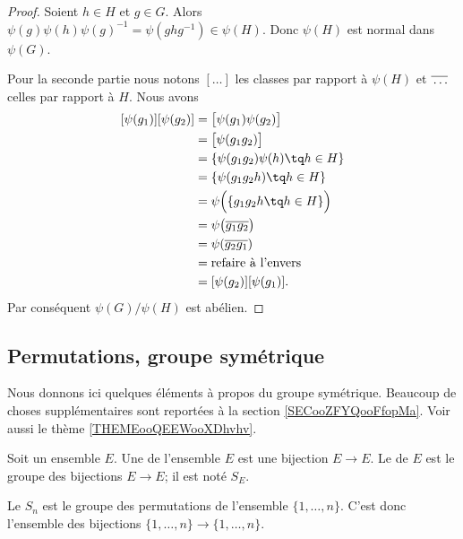 \begin{proof}
	Soient \( h\in H\) et \( g\in G\). Alors \( \psi(g)\psi(h)\psi(g)^{-1}=\psi(ghg^{-1})\in\psi(H)\). Donc \( \psi(H)\) est normal dans \( \psi(G)\).

	Pour la seconde partie nous notons \( [\ldots]\) les classes par rapport à \( \psi(H)\) et \( \overline{ \vphantom{g}\ldots }\) celles par rapport à \( H\). Nous avons
	\begin{subequations}
		\begin{align}
			[\psi(g_1)][\psi(g_2)] & =\big[ \psi(g_1)\psi(g_2) \big]            \\
			                       & =\big[ \psi(g_1g_2) \big]                  \\
			                       & =\{ \psi(g_1g_2)\psi(h)\tq h\in H \}       \\
			                       & =\{ \psi(g_1g_2h)\tq h\in H \}             \\
			                       & =\psi\Big(  \{ g_1g_2h\tq h\in H \}  \Big) \\
			                       & =\psi\big( \overline{ g_1g_2 } \big)       \\
			                       & =\psi(\overline{ g_2g_1 })                 \\
			                       & =\text{refaire à l'envers}                 \\
			                       & =[\psi(g_2)][\psi(g_1)].
		\end{align}
	\end{subequations}
	Par conséquent \( \psi(G)/\psi(H)\) est abélien.
\end{proof}

\subsection{Permutations, groupe symétrique}

Nous donnons ici quelques éléments à propos du groupe symétrique. Beaucoup de choses supplémentaires sont reportées à la section \ref{SECooZFYQooFfopMa}. Voir aussi le thème \ref{THEMEooQEEWooXDhvhv}.


\begin{definition}      \label{DEFooJNPIooMuzIXd}
	Soit un ensemble \( E\). Une  de l'ensemble \( E\) est une bijection \( E\to E\). Le  de \( E\) est le groupe des bijections \( E\to E\); il est noté \( S_E\).

	Le  \( S_n\) est le groupe des permutations de l'ensemble \( \{ 1,\ldots,n \}\). C'est donc l'ensemble des bijections \( \{ 1,\ldots, n \}\to\{ 1,\ldots, n \}\).
\end{definition}

